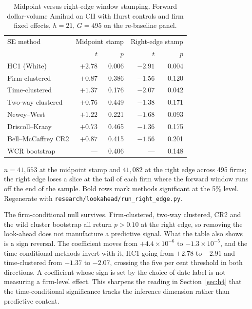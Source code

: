 \documentclass[preprint,12pt,authoryear]{elsarticle}
\begin{document}
\begin{table}[H]
\centering
\begin{threeparttable}
\caption{Midpoint versus right-edge window stamping. Forward dollar-volume Amihud on CII with Hurst controls and firm fixed effects, $h = 21$, $G = 495$ on the re-baseline panel.}
\label{tab:stamping}
\begin{tabular}{lrrrr}
\toprule
SE method & \multicolumn{2}{c}{Midpoint stamp} & \multicolumn{2}{c}{Right-edge stamp} \\
 & $t$ & $p$ & $t$ & $p$ \\
\midrule
HC1 (White) & $\mathbf{+2.78}$ & $\mathbf{0.006}$ & $\mathbf{-2.91}$ & $\mathbf{0.004}$ \\
Firm-clustered & $+0.87$ & 0.386 & $-1.56$ & 0.120 \\
Time-clustered & $+1.37$ & 0.176 & $\mathbf{-2.07}$ & $\mathbf{0.042}$ \\
Two-way clustered & $+0.76$ & 0.449 & $-1.38$ & 0.171 \\
Newey--West & $+1.22$ & 0.221 & $-1.68$ & 0.093 \\
Driscoll--Kraay & $+0.73$ & 0.465 & $-1.36$ & 0.175 \\
Bell--McCaffrey CR2 & $+0.87$ & 0.415 & $-1.56$ & 0.201 \\
WCR bootstrap & --- & 0.406 & --- & 0.148 \\
\bottomrule
\end{tabular}
\begin{tablenotes}
\small
\item $n = 41{,}553$ at the midpoint stamp and $41{,}082$ at the right edge across 495 firms; the right edge loses a slice at the tail of each firm where the forward window runs off the end of the sample. Bold rows mark methods significant at the 5\% level. Regenerate with \texttt{research/lookahead/run\_right\_edge.py}.
\end{tablenotes}
\end{threeparttable}
\end{table}

The firm-conditional null survives. Firm-clustered, two-way clustered, CR2 and the wild cluster bootstrap all return $p > 0.10$ at the right edge, so removing the look-ahead does not manufacture a predictive signal. What the table also shows is a sign reversal. The coefficient moves from $+4.4 \times 10^{-6}$ to $-1.3 \times 10^{-5}$, and the time-conditional methods invert with it, HC1 going from $+2.78$ to $-2.91$ and time-clustered from $+1.37$ to $-2.07$, crossing the five per cent threshold in both directions. A coefficient whose sign is set by the choice of date label is not measuring a firm-level effect. This sharpens the reading in Section~\ref{sec:h4} that the time-conditional significance tracks the inference dimension rather than predictive content.
\end{document}
